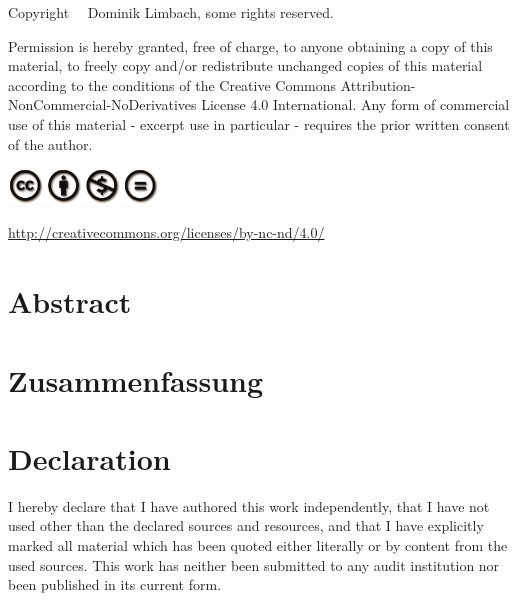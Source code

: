 \documentclass[
    12pt,
    a4paper,
	chapterprefix=false,
	parskip=full,
	headings=normal,
	numbers=noenddot
]{scrreprt}
\begin{document}
\thispagestyle{empty}

\clearpage
\vspace*{\fill}
\small
\begin{center}

	Copyright \textcopyright \ \the\year \ Dominik Limbach, some rights reserved.
	
	\begin{minipage}{0.85\textwidth}
		Permission is hereby granted, free of charge, to anyone obtaining a copy of this material, to freely copy and/or redistribute unchanged copies of this material according to the conditions of the Creative Commons Attribution-NonCommercial-NoDerivatives License 4.0 International. Any form of commercial use of this material - excerpt use in particular - requires the prior written consent of the author.
	\end{minipage}
	
	\includegraphics[width=4cm]{images/cc_by_nc_nd}
	
	\href{http://creativecommons.org/licenses/by-nc-nd/4.0/}{http://creativecommons.org/licenses/by-nc-nd/4.0/}

\end{center}
\normalsize
\thispagestyle{empty}
\clearpage

\newpage


\chapter*{Abstract}
\setcounter{page}{1}



\newpage


\chapter*{Zusammenfassung}




\newpage

\chapter*{Declaration}

I hereby declare that I have authored this work independently, that I have not used other than the declared sources and resources, and that I have explicitly marked all material which has been quoted either literally or by content from the used sources. This work has neither been submitted to any audit institution nor been published in its current form.\\
\end{document}
